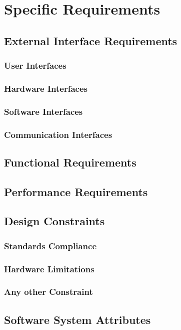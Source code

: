 \section{Specific Requirements}

\subsection{External Interface Requirements}
	\subsubsection{User Interfaces}
	\subsubsection{Hardware Interfaces}
	\subsubsection{Software Interfaces}
	\subsubsection{Communication Interfaces}

\subsection{Functional Requirements}

\subsection{Performance Requirements}

\subsection{Design Constraints}
	\subsubsection{Standards Compliance}
	\subsubsection{Hardware Limitations}
	\subsubsection{Any other Constraint}

\subsection{Software System Attributes}
